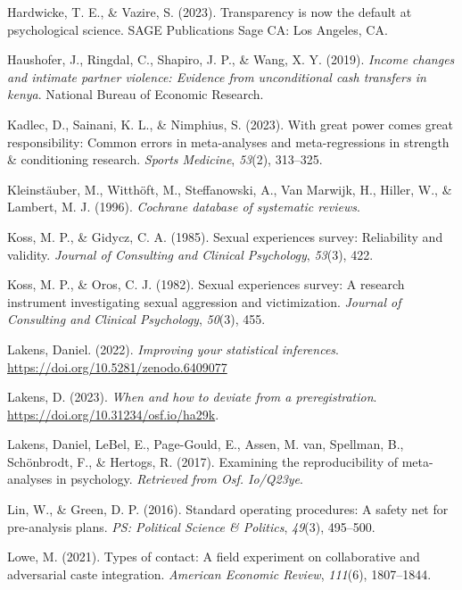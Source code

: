 \documentclass[
  ,jou]{apa6}
\newlength{\cslhangindent}
\newenvironment{CSLReferences}[2] %
 {\begin{list}{}{%
  \setlength{\itemindent}{0pt}
  \setlength{\leftmargin}{0pt}
  \setlength{\parsep}{0pt}
  \ifodd #1
   \setlength{\leftmargin}{\cslhangindent}
   \setlength{\itemindent}{-1\cslhangindent}
  \fi
  \setlength{\itemsep}{#2\baselineskip}}}
 {\end{list}}
\begin{document}
\begin{CSLReferences}{1}{0}
Hardwicke, T. E., \& Vazire, S. (2023). Transparency is now the default at psychological science. SAGE Publications Sage CA: Los Angeles, CA.

Haushofer, J., Ringdal, C., Shapiro, J. P., \& Wang, X. Y. (2019). \emph{Income changes and intimate partner violence: Evidence from unconditional cash transfers in kenya}. National Bureau of Economic Research.

Kadlec, D., Sainani, K. L., \& Nimphius, S. (2023). With great power comes great responsibility: Common errors in meta-analyses and meta-regressions in strength \& conditioning research. \emph{Sports Medicine}, \emph{53}(2), 313--325.

Kleinstäuber, M., Witthöft, M., Steffanowski, A., Van Marwijk, H., Hiller, W., \& Lambert, M. J. (1996). \emph{Cochrane database of systematic reviews}.

Koss, M. P., \& Gidycz, C. A. (1985). Sexual experiences survey: Reliability and validity. \emph{Journal of Consulting and Clinical Psychology}, \emph{53}(3), 422.

Koss, M. P., \& Oros, C. J. (1982). Sexual experiences survey: A research instrument investigating sexual aggression and victimization. \emph{Journal of Consulting and Clinical Psychology}, \emph{50}(3), 455.

Lakens, Daniel. (2022). \emph{Improving your statistical inferences}. \url{https://doi.org/10.5281/zenodo.6409077}

Lakens, D. (2023). \emph{When and how to deviate from a preregistration}. \url{https://doi.org/10.31234/osf.io/ha29k}.

Lakens, Daniel, LeBel, E., Page-Gould, E., Assen, M. van, Spellman, B., Schönbrodt, F., \& Hertogs, R. (2017). Examining the reproducibility of meta-analyses in psychology. \emph{Retrieved from Osf. Io/Q23ye}.

Lin, W., \& Green, D. P. (2016). Standard operating procedures: A safety net for pre-analysis plans. \emph{PS: Political Science \& Politics}, \emph{49}(3), 495--500.

Lowe, M. (2021). Types of contact: A field experiment on collaborative and adversarial caste integration. \emph{American Economic Review}, \emph{111}(6), 1807--1844.


\end{CSLReferences}
\end{document}
